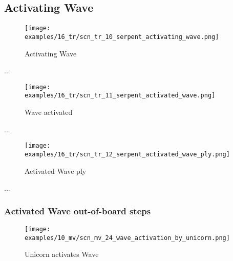 \subsection*{Activating Wave}

\noindent
\begin{wrapfigure}[8]{l}{0.4\textwidth}
\centering
\texttt{[image: examples/16\_tr/scn\_tr\_10\_serpent\_activating\_wave.png]}
\caption{Activating Wave}
\label{fig:scn_tr_10_serpent_activating_wave}
\end{wrapfigure}
...

\vspace*{10.0\baselineskip}
\noindent
\begin{wrapfigure}[8]{l}{0.4\textwidth}
\centering
\texttt{[image: examples/16\_tr/scn\_tr\_11\_serpent\_activated\_wave.png]}
\caption{Wave activated}
\label{fig:scn_tr_11_serpent_activated_wave}
\end{wrapfigure}
...

\clearpage %

\noindent
\begin{figure}[!h]
\texttt{[image: examples/16\_tr/scn\_tr\_12\_serpent\_activated\_wave\_ply.png]}
\caption{Activated Wave ply}
\label{fig:scn_tr_12_serpent_activated_wave_ply}
\end{figure}

...

\clearpage %

\subsubsection*{Activated Wave out-of-board steps}

\noindent
\begin{figure}[!h]
\texttt{[image: examples/10\_mv/scn\_mv\_24\_wave\_activation\_by\_unicorn.png]}
\caption{Unicorn activates Wave}
\label{fig:scn_mv_24_wave_activation_by_unicorn}
\end{figure}

